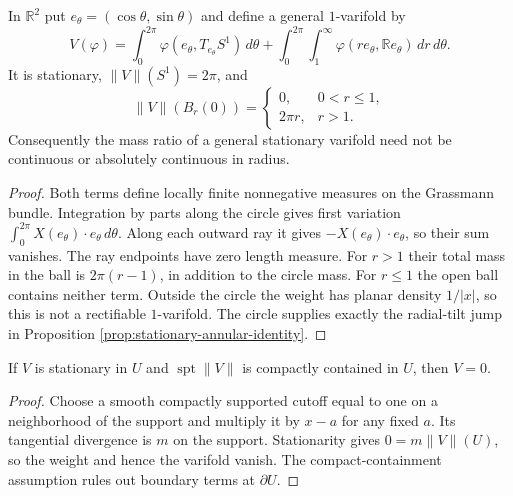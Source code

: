 \begin{example}\label{ex:stationary-circle-rays}
In $\mathbb R^2$ put $e_\theta=(\cos\theta,\sin\theta)$ and define a general $1$-varifold by
\[
 V(\varphi)=\int_0^{2\pi}\varphi(e_\theta,T_{e_\theta}S^1)\,d\theta
 +\int_0^{2\pi}\int_1^\infty\varphi(r e_\theta,\mathbb R e_\theta)\,dr\,d\theta.
\]
It is stationary, $\|V\|(S^1)=2\pi$, and
\[
 \|V\|(B_r(0))=\begin{cases}0,&0<r\leq1,\\2\pi r,&r>1.\end{cases}
\]
Consequently the mass ratio of a general stationary varifold need not be continuous or absolutely continuous in radius.
\end{example}
\begin{proof}
Both terms define locally finite nonnegative measures on the Grassmann bundle. Integration by parts along the circle gives first variation $\int_0^{2\pi}X(e_\theta)\cdot e_\theta\,d\theta$. Along each outward ray it gives $-X(e_\theta)\cdot e_\theta$, so their sum vanishes. The ray endpoints have zero length measure. For $r>1$ their total mass in the ball is $2\pi(r-1)$, in addition to the circle mass. For $r\leq1$ the open ball contains neither term. Outside the circle the weight has planar density $1/|x|$, so this is not a rectifiable $1$-varifold. The circle supplies exactly the radial-tilt jump in Proposition \ref{prop:stationary-annular-identity}.
\end{proof}

\begin{proposition}\label{prop:no-compact-stationary-varifold}
If $V$ is stationary in $U$ and $\operatorname{spt}\|V\|$ is compactly contained in $U$, then $V=0$.
\end{proposition}
\begin{proof}
Choose a smooth compactly supported cutoff equal to one on a neighborhood of the support and multiply it by $x-a$ for any fixed $a$. Its tangential divergence is $m$ on the support. Stationarity gives $0=m\|V\|(U)$, so the weight and hence the varifold vanish. The compact-containment assumption rules out boundary terms at $\partial U$.
\end{proof}
